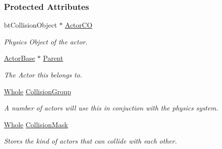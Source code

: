 \subsubsection*{Protected Attributes}
\begin{DoxyCompactItemize}
\item 
\hypertarget{classphys_1_1ActorBasePhysicsSettings_a259d4d10541b28d389ffa287f07ec916}{
btCollisionObject $\ast$ \hyperlink{classphys_1_1ActorBasePhysicsSettings_a259d4d10541b28d389ffa287f07ec916}{ActorCO}}
\label{classphys_1_1ActorBasePhysicsSettings_a259d4d10541b28d389ffa287f07ec916}

\begin{DoxyCompactList}\small\item\em Physics Object of the actor. \item\end{DoxyCompactList}\item 
\hypertarget{classphys_1_1ActorBasePhysicsSettings_a2bd46cc0b9e675c409d5e09772126030}{
\hyperlink{classphys_1_1ActorBase}{ActorBase} $\ast$ \hyperlink{classphys_1_1ActorBasePhysicsSettings_a2bd46cc0b9e675c409d5e09772126030}{Parent}}
\label{classphys_1_1ActorBasePhysicsSettings_a2bd46cc0b9e675c409d5e09772126030}

\begin{DoxyCompactList}\small\item\em The Actor this belongs to. \item\end{DoxyCompactList}\item 
\hypertarget{classphys_1_1ActorBasePhysicsSettings_a6a95b9dceba9a60f87b2ae0f3109b638}{
\hyperlink{namespacephys_a460f6bc24c8dd347b05e0366ae34f34a}{Whole} \hyperlink{classphys_1_1ActorBasePhysicsSettings_a6a95b9dceba9a60f87b2ae0f3109b638}{CollisionGroup}}
\label{classphys_1_1ActorBasePhysicsSettings_a6a95b9dceba9a60f87b2ae0f3109b638}

\begin{DoxyCompactList}\small\item\em A number of actors will use this in conjuction with the physics system. \item\end{DoxyCompactList}\item 
\hypertarget{classphys_1_1ActorBasePhysicsSettings_ae5f0c41d16868bf67e834b643207521f}{
\hyperlink{namespacephys_a460f6bc24c8dd347b05e0366ae34f34a}{Whole} \hyperlink{classphys_1_1ActorBasePhysicsSettings_ae5f0c41d16868bf67e834b643207521f}{CollisionMask}}
\label{classphys_1_1ActorBasePhysicsSettings_ae5f0c41d16868bf67e834b643207521f}

\begin{DoxyCompactList}\small\item\em Stores the kind of actors that can collide with each other. \item\end{DoxyCompactList}\end{DoxyCompactItemize}



